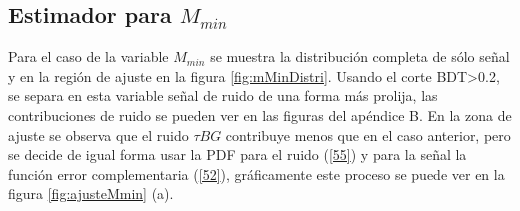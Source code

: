 \newpage
\subsection{Estimador para \texorpdfstring{$M_{min}$}{TEXT}}



Para el caso de la variable \(M_{min}\) se muestra la distribución completa de sólo señal y en la región de ajuste en la figura \ref{fig:mMinDistri}. Usando el corte BDT>0.2, se separa en esta variable señal de ruido de una forma más prolija, las contribuciones de ruido se pueden ver en las figuras del apéndice B. En la zona de ajuste se observa que el ruido \(\tau BG\) contribuye menos que en el caso anterior, pero se decide de igual forma usar la PDF para el ruido (\ref{55}) y para la señal la función error complementaria (\ref{52}), gráficamente este proceso se puede ver en la figura \ref{fig:ajusteMmin} (a).

